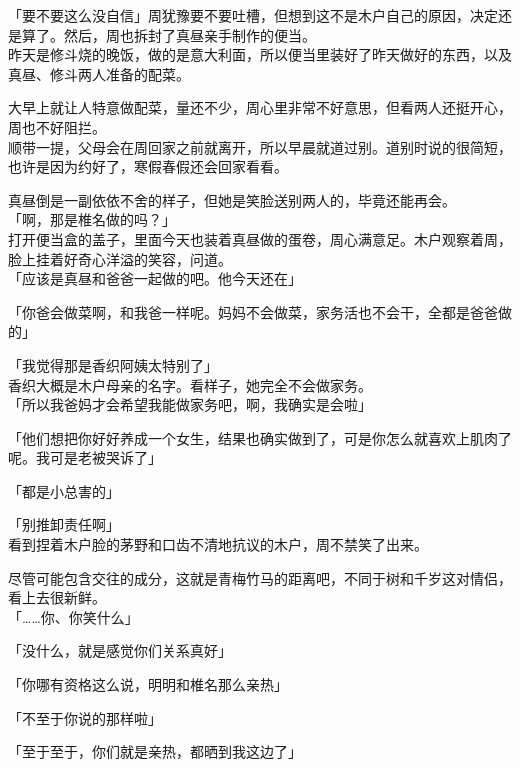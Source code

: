 「要不要这么没自信」周犹豫要不要吐槽，但想到这不是木户自己的原因，决定还是算了。然后，周也拆封了真昼亲手制作的便当。\\

昨天是修斗烧的晚饭，做的是意大利面，所以便当里装好了昨天做好的东西，以及真昼、修斗两人准备的配菜。

大早上就让人特意做配菜，量还不少，周心里非常不好意思，但看两人还挺开心，周也不好阻拦。\\

顺带一提，父母会在周回家之前就离开，所以早晨就道过别。道别时说的很简短，也许是因为约好了，寒假春假还会回家看看。

真昼倒是一副依依不舍的样子，但她是笑脸送别两人的，毕竟还能再会。\\

「啊，那是椎名做的吗？」\\

打开便当盒的盖子，里面今天也装着真昼做的蛋卷，周心满意足。木户观察着周，脸上挂着好奇心洋溢的笑容，问道。\\

「应该是真昼和爸爸一起做的吧。他今天还在」

「你爸会做菜啊，和我爸一样呢。妈妈不会做菜，家务活也不会干，全都是爸爸做的」

「我觉得那是香织阿姨太特别了」\\

香织大概是木户母亲的名字。看样子，她完全不会做家务。\\

「所以我爸妈才会希望我能做家务吧，啊，我确实是会啦」

「他们想把你好好养成一个女生，结果也确实做到了，可是你怎么就喜欢上肌肉了呢。我可是老被哭诉了」

「都是小总害的」

「别推卸责任啊」\\

看到捏着木户脸的茅野和口齿不清地抗议的木户，周不禁笑了出来。

尽管可能包含交往的成分，这就是青梅竹马的距离吧，不同于树和千岁这对情侣，看上去很新鲜。\\

「……你、你笑什么」

「没什么，就是感觉你们关系真好」

「你哪有资格这么说，明明和椎名那么亲热」

「不至于你说的那样啦」

「至于至于，你们就是亲热，都晒到我这边了」\\

